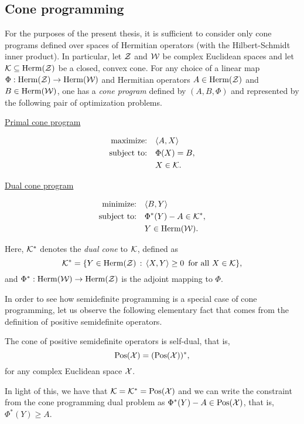 \subsection*{Cone programming}
\label{sec:cone-programming}
For the purposes of the present thesis, it is sufficient to consider only cone
programs defined over spaces of Hermitian operators (with the Hilbert-Schmidt
inner product).
In particular, let $\mathcal{Z}$ and $\mathcal{W}$ be complex Euclidean spaces and let 
$\mathcal{K}\subseteq\mathrm{Herm}(\mathcal{Z})$ be a closed, convex cone.
For any choice of a linear map
$\Phi:\mathrm{Herm}(\mathcal{Z})\rightarrow\mathrm{Herm}(\mathcal{W})$ and
Hermitian operators $A\in\mathrm{Herm}(\mathcal{Z})$ and $B\in\mathrm{Herm}(\mathcal{W})$, one has a \emph{cone
program} defined by $(A,B,\Phi)$ and represented by the following pair of 
optimization problems.
\begin{center}
  \begin{minipage}{2in}
    \centerline{\underline{Primal cone program}}\vspace{-7mm}
    \begin{align*}
      \text{maximize:}\quad & \langle A , X\rangle\\
      \text{subject to:}\quad & \Phi(X) = B,\\
      & X \in \mathcal{K}.
    \end{align*}
  \end{minipage}
  \hspace*{1.5cm}
  \begin{minipage}{2.4in}
    \centerline{\underline{Dual cone program}}\vspace{-7mm}
    \begin{align*}
      \text{minimize:}\quad & \langle B , Y\rangle\\
      \text{subject to:}\quad & \Phi^{\ast}(Y) - A \in \mathcal{K}^{\ast},\\
      & Y\in\mathrm{Herm}(\mathcal{W}).
    \end{align*}
  \end{minipage}
\end{center}

Here, $\mathcal{K}^{\ast}$ denotes the \emph{dual cone} to $\mathcal{K}$, defined as
\begin{equation}
\label{eq:dual-cone}
  \mathcal{K}^{\ast} = \{Y\in\mathrm{Herm}(\mathcal{Z})\,:\,\langle X , Y\rangle \geq 0\;\:\text{for all $X\in\mathcal{K}$}\},
\end{equation}
and $\Phi^{\ast}:\mathrm{Herm}(\mathcal{W})\rightarrow\mathrm{Herm}(\mathcal{Z})$ is the adjoint mapping to
$\Phi$.

In order to see how semidefinite programming is a special case of cone programming, 
let us observe the following elementary fact that comes from the definition of 
positive semidefinite operators.
\begin{fact}
\label{fact:pos-self-dual}
The cone of positive semidefinite operators is self-dual, that is, 
\begin{equation}
\mathrm{Pos}(\mathcal{X}) = (\mathrm{Pos}(\mathcal{X}))^{\ast},
\end{equation}
for any complex Euclidean space $\mathcal{X}$.
\end{fact}
In light of this, we have that $\mathcal{K} = \mathcal{K}^{\ast} = \mathrm{Pos}(\mathcal{X})$ and we can write the
constraint from the cone programming dual problem as
$\Phi^{\ast}(Y) - A \in \mathrm{Pos}(\mathcal{X})$, that is, $\Phi^{\ast}(Y) \geq A$.

